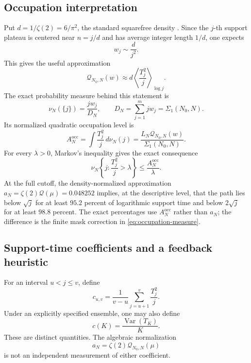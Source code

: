 \documentclass[11pt,reqno]{amsart}
\numberwithin{equation}{section}
\theoremstyle{plain}
\theoremstyle{definition}
\theoremstyle{remark}
\newcommand{\Var}{\operatorname{Var}}
\newcommand{\QF}{\mathcal Q}
\begin{document}
\subsection{Occupation interpretation}
\label{subsec:occupation-interpretation}

Put \(d=1/\zeta(2)=6/\pi^2\), the standard squarefree density
\cite{MontgomeryVaughan2007}.  Since the \(j\)-th support plateau is centered
near \(n=j/d\) and has average integer length \(1/d\), one expects
\begin{equation}
w_j\sim\frac{d}{j^2}.
\label{eq:plateau-weight-asymptotic}
\end{equation}
This gives the useful approximation
\begin{equation}
\QF_{N_0,N}(w)
\approx d\left\langle\frac{T_j^2}{j}\right\rangle_{\log j}.
\label{eq:logarithmic-occupation-approximation}
\end{equation}
The exact probability measure behind this statement is
\begin{equation}
\nu_N(\{j\})=\frac{jw_j}{D_N},\qquad
D_N=\sum_{j=1}^m jw_j=\Sigma_1(N_0,N).
\label{eq:occupation-measure}
\end{equation}
Its normalized quadratic occupation level is
\begin{equation}
A_N^{\mathrm{occ}}
=\int\frac{T_j^2}{j}\,d\nu_N(j)
=\frac{L_N\QF_{N_0,N}(w)}{\Sigma_1(N_0,N)}.
\label{eq:exact-occupation-level}
\end{equation}
For every \(\lambda>0\), Markov's inequality gives the exact consequence
\begin{equation}
\nu_N\left\{j:\frac{T_j^2}{j}>\lambda\right\}
\leq\frac{A_N^{\mathrm{occ}}}{\lambda}.
\label{eq:occupation-markov}
\end{equation}
At the full cutoff, the density-normalized approximation
\(a_N=\zeta(2)\QF(\mu)=0.048252\) implies, at the descriptive level, that the
path lies below \(\sqrt j\) for at least \(95.2\) percent of logarithmic
support time and below \(2\sqrt j\) for at least \(98.8\) percent.  The exact
percentages use \(A_N^{\mathrm{occ}}\) rather than \(a_N\); the difference is
the finite mask correction in \eqref{eq:occupation-measure}.

\subsection{Support-time coefficients and a feedback heuristic}
\label{subsec:support-time-coefficients}

For an interval \(u<j\leq v\), define
\begin{equation}
c_{u,v}=\frac{1}{v-u}\sum_{j=u+1}^{v}\frac{T_j^2}{j}.
\label{eq:local-support-coefficient}
\end{equation}
Under an explicitly specified ensemble, one may also define
\begin{equation}
c(K)=\frac{\Var(T_K)}{K}.
\label{eq:variance-scale-coefficient}
\end{equation}
These are distinct quantities.  The algebraic normalization
\begin{equation}
a_N=\zeta(2)\QF_{N_0,N}(\mu)
\label{eq:density-normalized-quadratic-mass}
\end{equation}
is not an independent measurement of either coefficient.
\end{document}
